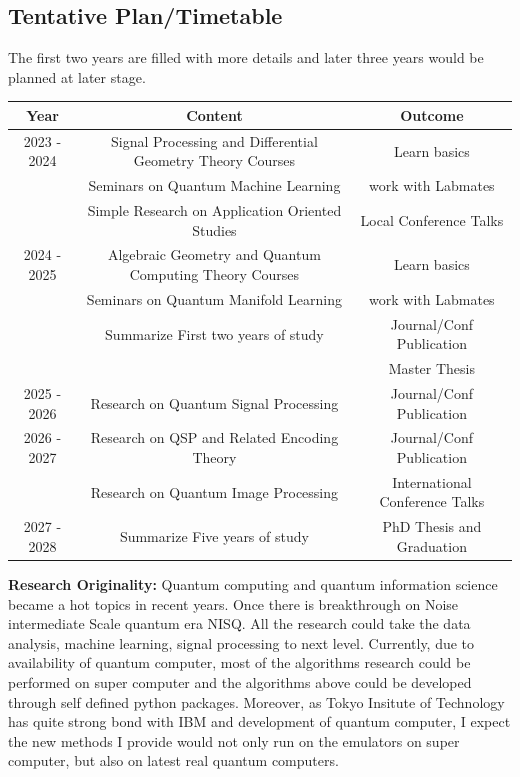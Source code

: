 \documentclass{article}
\begin{document}
\subsection{Tentative Plan/Timetable}
The first two years are filled with more details 
and later three years would be planned at later stage. 

\begin{center}
  \begin{tabular}{c|c|c}
    Year & Content & Outcome \\
    \hline
    2023 - 2024 &  Signal Processing and Differential Geometry Theory Courses& Learn basics \\
                &  Seminars on Quantum Machine Learning &  work with Labmates \\
                &  Simple Research on Application Oriented Studies & Local Conference Talks \\ 
    2024 - 2025 &  Algebraic Geometry and Quantum Computing Theory Courses & Learn basics \\
                &  Seminars on Quantum Manifold Learning  & work with Labmates \\
                &  Summarize First two years of study & Journal/Conf Publication \\
                & & Master Thesis \\
    \hline
    2025 - 2026 &  Research on Quantum Signal Processing  & Journal/Conf Publication\\
    2026 - 2027 &  Research on QSP and Related Encoding Theory  & Journal/Conf Publication \\
    & Research on Quantum Image Processing & International Conference Talks \\
    2027 - 2028 &  Summarize Five years of study & PhD Thesis and Graduation 
  \end{tabular}
\end{center}

\textbf{Research Originality:}
Quantum computing and quantum information science became a hot topics in 
recent years. \cite{qml_hep}
Once there is breakthrough on Noise intermediate Scale quantum era NISQ. All 
the research could take the data analysis, machine learning, signal processing 
to next level. Currently, due to availability of quantum computer, most of the 
algorithms research could be performed on super computer and the algorithms 
above could be developed through self defined python packages. 
Moreover, as Tokyo Insitute of Technology has quite strong bond with 
IBM and development of quantum computer, I expect the new methods I provide 
would not only run on the emulators on super computer, but also on latest real 
quantum computers. 
\end{document}
